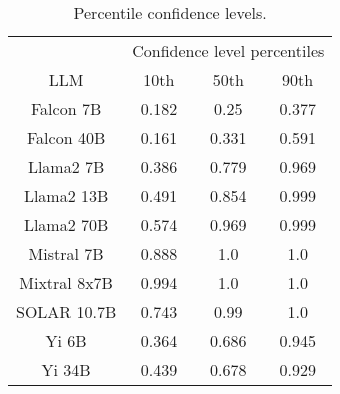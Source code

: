 \begin{table*}
\centering
\begin{tabular}{c|c|c|c}
& \multicolumn{3}{c}{Confidence level percentiles} \\ 
LLM & 10th & 50th & 90th\\ \hline
Falcon 7B & 0.182 & 0.25 & 0.377\\
Falcon 40B & 0.161 & 0.331 & 0.591\\
Llama2 7B & 0.386 & 0.779 & 0.969\\
Llama2 13B & 0.491 & 0.854 & 0.999\\
Llama2 70B & 0.574 & 0.969 & 0.999\\
Mistral 7B & 0.888 & 1.0 & 1.0\\
Mixtral 8x7B & 0.994 & 1.0 & 1.0\\
SOLAR 10.7B & 0.743 & 0.99 & 1.0\\
Yi 6B & 0.364 & 0.686 & 0.945\\
Yi 34B & 0.439 & 0.678 & 0.929\\
\hline
\end{tabular}
\caption{Percentile confidence levels.}
\label{tab:percentile_conf}
\end{table*}
